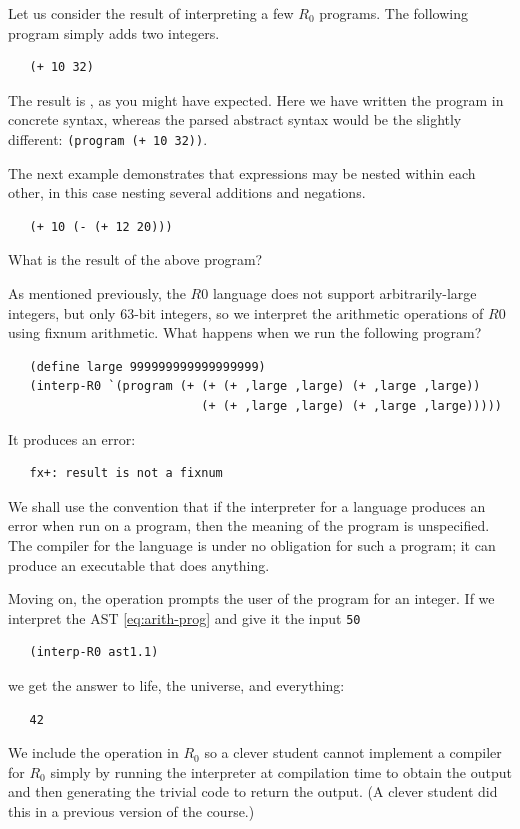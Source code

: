 \documentclass[11pt]{book}
\begin{document}
Let us consider the result of interpreting a few $R_0$ programs. The
following program simply adds two integers.
\begin{lstlisting}
   (+ 10 32)
\end{lstlisting}
The result is , as you might have expected.  Here we have written the
program in concrete syntax, whereas the parsed abstract syntax would be the
slightly different: \lstinline{(program (+ 10 32))}.

The next example demonstrates that expressions may be nested within
each other, in this case nesting several additions and negations.
\begin{lstlisting}
   (+ 10 (- (+ 12 20)))
\end{lstlisting}
What is the result of the above program?

As mentioned previously, the $R0$ language does not support
arbitrarily-large integers, but only $63$-bit integers, so we
interpret the arithmetic operations of $R0$ using fixnum arithmetic.
What happens when we run the following program?
\begin{lstlisting}
   (define large 999999999999999999)
   (interp-R0 `(program (+ (+ (+ ,large ,large) (+ ,large ,large))
                           (+ (+ ,large ,large) (+ ,large ,large)))))
\end{lstlisting}
It produces an error:
\begin{lstlisting}
   fx+: result is not a fixnum
\end{lstlisting}
We shall use the convention that if the interpreter for a language
produces an error when run on a program, then the meaning of the
program is unspecified. The compiler for the language is under no
obligation for such a program; it can produce an executable that does
anything.

\noindent
Moving on, the  operation prompts the user of the program
for an integer. If we interpret the AST \eqref{eq:arith-prog} and give
it the input \texttt{50}
\begin{lstlisting}
   (interp-R0 ast1.1)
\end{lstlisting}
we get the answer to life, the universe, and everything:
\begin{lstlisting}
   42
\end{lstlisting}
We include the  operation in $R_0$ so a clever student
cannot implement a compiler for $R_0$ simply by running the
interpreter at compilation time to obtain the output and then
generating the trivial code to return the output.  (A clever student
did this in a previous version of the course.)
\end{document}
